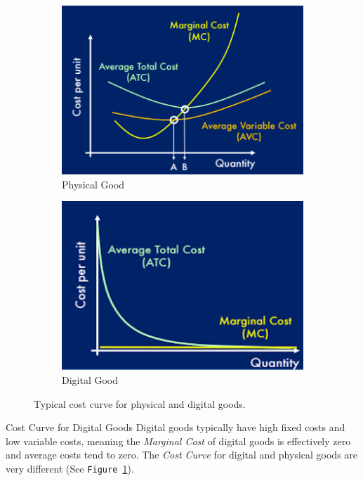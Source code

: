 \documentclass[11pt,a4paper]{article}
\begin{document}
  \begin{figure}[ht!]
    \centering
    \begin{subfigure}[b]{.45\textwidth}
         \centering
         \includegraphics[width=\textwidth]{physicalCostCurve.PNG}
         \caption{Physical Good}
    \end{subfigure}
    \begin{subfigure}[b]{.45\textwidth}
         \centering
         \includegraphics[width=\textwidth]{digitalCostCurve.PNG}
         \caption{Digital Good}
    \end{subfigure}
    \caption{Typical cost curve for physical and digital goods.}
    \label{fig_DigitalCostCurve}
  \end{figure}

  \begin{proposition}{Cost Curve for Digital Goods}
    Digital goods typically have high fixed costs and low variable costs, meaning the \textit{Marginal Cost} of digital goods is effectively zero and average costs tend to zero. The \textit{Cost Curve} for digital and physical goods are very different (See \texttt{Figure \ref{fig_DigitalCostCurve}}).
  \end{proposition}
\end{document}
